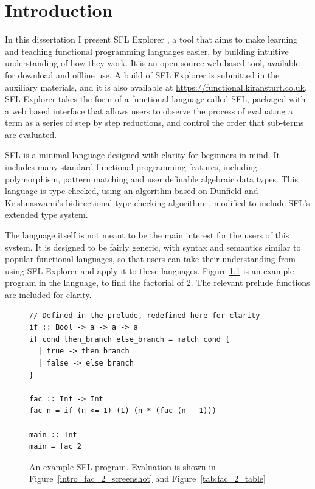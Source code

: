 \chapter{Introduction}
\label{chap:context}
In this dissertation I present SFL Explorer , a tool that aims to make learning and teaching functional programming languages easier, by building intuitive understanding of how they work. It is an open source web based tool, available for download and offline use. A build of SFL Explorer  is submitted in the auxiliary materials, and it is also available at \href{https://functional.kiransturt.co.uk}{https://functional.kiransturt.co.uk}. 
SFL Explorer  takes the form of a functional language called \ac{SFL}, packaged with a web based interface that allows users to observe the process of evaluating a term as a series of step by step reductions, and control the order that sub-terms are evaluated. 


\ac{SFL} is a minimal language designed with clarity for beginners in mind. It includes many standard functional programming features, including polymorphism, pattern matching and user definable algebraic data types. This language is type checked, using an algorithm based on Dunfield and Krishnaswami's bidirectional type checking algorithm~\cite{completebidir}, modified to include \ac{SFL}'s extended type system. 

The language itself is not meant to be the main interest for the users of this system. It is designed to be fairly generic, with syntax and semantics similar to popular functional languages, so that users can take their understanding from using SFL Explorer  and apply it to these languages. Figure \ref{tab:fac_2_table_input} is an example program in the language, to find the factorial of 2. The relevant prelude functions are included for clarity.

\begin{figure}[h]
\begin{lstlisting}[language=SFL]
// Defined in the prelude, redefined here for clarity
if :: Bool -> a -> a -> a
if cond then_branch else_branch = match cond {
  | true -> then_branch
  | false -> else_branch
}

fac :: Int -> Int
fac n = if (n <= 1) (1) (n * (fac (n - 1)))

main :: Int
main = fac 2
\end{lstlisting}
\caption{An example SFL program. Evaluation is shown in Figure~\ref{intro_fac_2_screenshot} and Figure~\ref{tab:fac_2_table}}
\label{tab:fac_2_table_input}
\end{figure}


